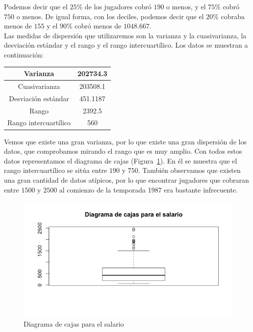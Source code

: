 \documentclass[12pt,a4paper,twoside,openright,titlepage,final]{article}
\begin{document}
Podemos decir que el $25\%$ de los jugadores cobró $190$ o menos, y el $75\%$ cobró $750$ o menos. De igual forma, con los deciles, podemos decir que el $20\%$ cobraba menos de $155$ y el $90\%$ cobró menos de $1048.667$.\\

Las medidas de dispersión que utilizaremos son la varianza y la cuasivarianza, la desviación estándar y el rango y el rango intercuartílico. Los datos se muestran a continuación:

\begin{table}[htbp]
\centering
\begin{tabular}{|c|c|}
\hline Varianza & 202734.3 \\ 
\hline Cuasivarianza & 203508.1 \\
\hline Desviación estándar & 451.1187 \\  
\hline Rango & 2392.5  \\ 
\hline Rango intercuartílico & 560  \\ 
\hline 
\end{tabular} 
\end{table}

Vemos que existe una gran varianza, por lo que existe una gran dispersión de los datos, que comprobamos mirando el rango que es muy amplio. Con todos estos datos representamos el diagrama de cajas (Figura~\ref{fig:diagrama_cajas_salario}). En él se muestra que el rango intercuartílico se sitúa entre $190$ y $750$. También observamos que existen una gran cantidad de datos atípicos, por lo que encontrar jugadores que cobraran entre $1500$ y $2500$ al comienzo de la temporada 1987 era bastante infrecuente.\\

\begin{figure}[tbph!]
\centering
\includegraphics[width=0.8\linewidth]{imagenes/diagrama_cajas_salario}
\caption{Diagrama de cajas para el salario}
\label{fig:diagrama_cajas_salario}
\end{figure}
\end{document}
